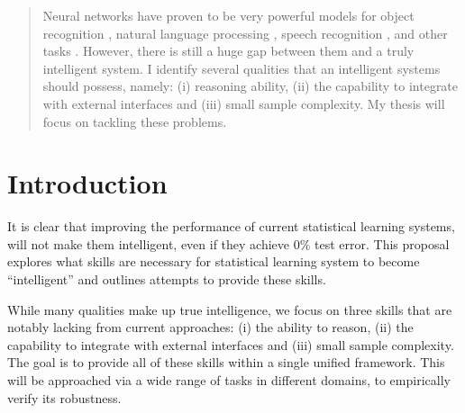 \documentclass{article}
\begin{document}
 


\begin{abstract}

  Neural networks have proven to be very powerful models for object
  recognition \cite{krizhevsky2012imagenet}, natural language
  processing \cite{mikolov2012statistical}, speech recognition
  \cite{graves2013speech}, and other tasks
  \cite{sutskever2014sequence}.  However, there is still a huge gap
  between them and a truly intelligent system.  I identify several
  qualities that an intelligent systems should possess, namely: (i)
  reasoning ability, (ii) the capability to integrate with external
  interfaces and (iii) small sample complexity. My thesis will focus on
  tackling these problems.

\end{abstract} 

\section{Introduction}
It is clear that improving the performance of current statistical learning systems, 
will not make them intelligent, even if they achieve
$0\%$ test error. This proposal explores what skills are necessary for statistical
learning system to become ``intelligent'' and outlines attempts to
provide these skills. 

While many qualities make up true intelligence, we focus on three
skills that are notably lacking from current approaches: (i) the
ability to reason, (ii) the capability to integrate with external
interfaces and (iii) small sample complexity. The goal is to provide
all of these skills within a single unified framework. This will be
approached via a wide range of tasks in different domains, to empirically
verify its robustness. 
\end{document}
